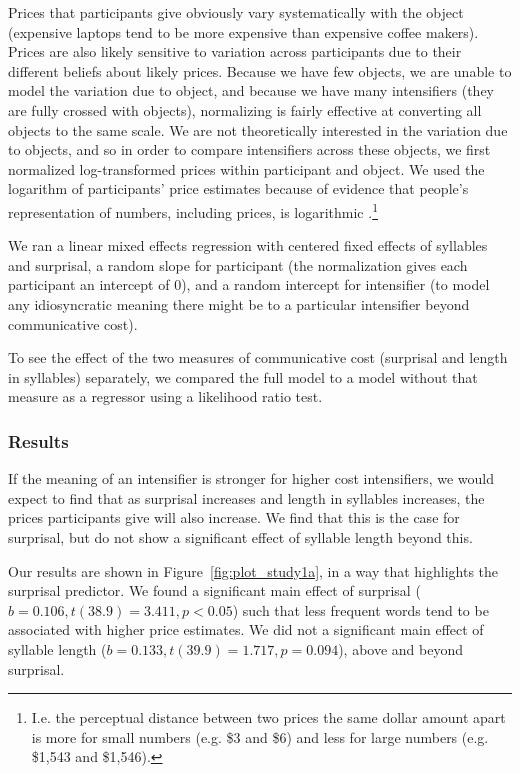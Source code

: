 \documentclass[10pt,letterpaper]{article}
\begin{document}
Prices that participants give obviously vary systematically with the object (expensive laptops tend to be more expensive than expensive coffee makers).
Prices are also likely sensitive to variation across participants due to their different beliefs about likely prices.
Because we have few objects, we are unable to model the variation due to object, and because we have many intensifiers (they are fully crossed with objects), normalizing is fairly effective at converting all objects to the same scale.
We are not theoretically interested in the variation due to objects, and so in order to compare intensifiers across these objects, we first normalized log-transformed prices within participant and object.
We used the logarithm of participants' price estimates because of evidence that people's representation of numbers, including prices, is logarithmic \cite{fechner_elements_1860}.\footnote{
  I.e. the perceptual distance between two prices the same dollar amount apart is more for small numbers (e.g. \$3 and \$6) and less for large numbers (e.g. \$1,543 and \$1,546).
}

We ran a linear mixed effects regression with centered fixed effects of syllables and surprisal, a random slope for participant (the normalization gives each participant an intercept of 0), and a random intercept for intensifier (to model any idiosyncratic meaning there might be to a particular intensifier beyond communicative cost).

To see the effect of the two measures of communicative cost (surprisal and length in syllables) separately, we compared the full model to a model without that measure as a regressor using a likelihood ratio test.

\subsubsection{Results}

If the meaning of an intensifier is stronger for higher cost intensifiers, we would expect to find that as surprisal increases and length in syllables increases, the prices participants give will also increase. We find that this is the case for surprisal, but do not show a significant effect of syllable length beyond this.

Our results are shown in Figure~\ref{fig:plot_study1a}, in a way that highlights the surprisal predictor. 
We found a significant main effect of surprisal ($b=0.106,t(38.9)=3.411,p<0.05$) such that less frequent words tend to be associated with higher price estimates.
We did not a significant main effect of syllable length ($b=0.133,t(39.9)=1.717,p=0.094$), above and beyond surprisal.
\end{document}
